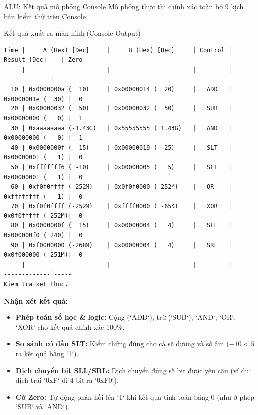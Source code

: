 \begin{frame}[fragile]{ALU: Kết quả mô phỏng Console}
    Mô phỏng thực thi chính xác toàn bộ 9 kịch bản kiểm thử trên Console:
    \vspace{0.1cm}
    
    \begin{block}{Kết quả xuất ra màn hình (Console Output)}
        \begin{lstlisting}[basicstyle=\fontsize{5.5pt}{6.5pt}\selectfont\ttfamily]
Time |     A (Hex) [Dec]     |     B (Hex) [Dec]     | Control |   Result [Dec]    | Zero
-----|-----------------------|-----------------------|---------|-------------------|-----
  10 | 0x0000000a (  10)     | 0x00000014 (  20)     |   ADD   | 0x0000001e (  30) |  0
  20 | 0x00000032 (  50)     | 0x00000032 (  50)     |   SUB   | 0x00000000 (   0) |  1
  30 | 0xaaaaaaaa (-1.43G)   | 0x55555555 ( 1.43G)   |   AND   | 0x00000000 (   0) |  1
  40 | 0x0000000f (  15)     | 0x00000019 (  25)     |   SLT   | 0x00000001 (   1) |  0
  50 | 0xfffffff6 ( -10)     | 0x00000005 (   5)     |   SLT   | 0x00000001 (   1) |  0
  60 | 0xf0f0ffff (-252M)    | 0x0f0f0000 ( 252M)    |   OR    | 0xffffffff (  -1) |  0
  70 | 0xf0f0ffff (-252M)    | 0xffff0000 ( -65K)    |   XOR   | 0x0f0fffff ( 252M)|  0
  80 | 0x0000000f (  15)     | 0x00000004 (   4)     |   SLL   | 0x000000f0 ( 240) |  0
  90 | 0xf0000000 (-268M)    | 0x00000004 (   4)     |   SRL   | 0x0f000000 ( 251M)|  0
-----|-----------------------|-----------------------|---------|-------------------|-----
Kiem tra ket thuc.
        \end{lstlisting}
    \end{block}
    
    \vspace{-0.05cm}
    \scriptsize
    \textbf{Nhận xét kết quả:}
    \begin{itemize}
        \item \textbf{Phép toán số học \& logic:} Cộng (`ADD`), trừ (`SUB`), `AND`, `OR`, `XOR` cho kết quả chính xác 100\%.
        \item \textbf{So sánh có dấu SLT:} Kiểm chứng đúng cho cả số dương và số âm ($-10 < 5$ ra kết quả bằng `1`).
        \item \textbf{Dịch chuyển bit SLL/SRL:} Dịch chuyển đúng số bit được yêu cầu (ví dụ: dịch trái `0xF` đi 4 bit ra `0xF0`).
        \item \textbf{Cờ Zero:} Tự động phản hồi lên `1` khi kết quả tính toán bằng 0 (như ở phép `SUB` và `AND`).
    \end{itemize}
\end{frame}

